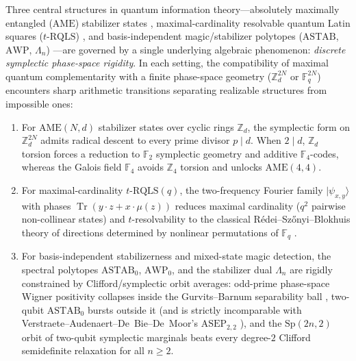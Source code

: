 \documentclass[11pt,reqno]{amsart}
\theoremstyle{definition}
\newcommand{\ZZ}{\mathbb{Z}}
\newcommand{\FF}{\mathbb{F}}
\newcommand{\Tr}{\operatorname{Tr}}
\newcommand{\AME}{\mathrm{AME}}
\newcommand{\RQLS}{\mathrm{RQLS}}
\newcommand{\ASTAB}{\mathrm{ASTAB}}
\newcommand{\AWP}{\mathrm{AWP}}
\newcommand{\ASEP}{\mathrm{ASEP}}
\newcommand{\Sp}{\mathrm{Sp}}
\begin{document}
Three central structures in quantum information theory---absolutely maximally entangled
($\AME$) stabilizer states \cite{scott2004multipartite,huber2018bounds,rajchel2025ame,
wojcik2026ame,cha2026ame}, maximal-cardinality resolvable quantum Latin squares
($t$-$\RQLS$) \cite{musto2016qls,rather2022euler,ball2026moqls,zhang2026rqls}, and
basis-independent magic/stabilizer polytopes ($\ASTAB$, $\AWP$, $\Lambda_n$)
\cite{gross2006hudson,raussendorf2020phase,zurel2020hvm,liu2025triangle,zurel2026astab}---are
governed by a single underlying algebraic phenomenon: \emph{discrete symplectic
phase-space rigidity}. In each setting, the compatibility of maximal quantum
complementarity with a finite phase-space geometry ($\ZZ_d^{2N}$ or $\FF_q^{2N}$)
encounters sharp arithmetic transitions separating realizable structures from impossible
ones:
\begin{enumerate}[label=(\roman*)]
  \item For $\AME(N, d)$ stabilizer states over cyclic rings $\ZZ_d$, the symplectic
    form on $\ZZ_d^{2N}$ admits radical descent to every prime divisor $p \mid d$.
    When $2 \mid d$, $\ZZ_d$ torsion forces a reduction to $\FF_2$ symplectic geometry
    and additive $\FF_4$-codes, whereas the Galois field $\FF_4$ avoids $\ZZ_4$ torsion
    and unlocks $\AME(4,4)$.
  \item For maximal-cardinality $t$-$\RQLS(q)$, the two-frequency Fourier family
    $|\psi_{x,y}\rangle$ with phases $\Tr(y \cdot z + x \cdot \mu(z))$ reduces maximal
    cardinality ($q^2$ pairwise non-collinear states) and $t$-resolvability to the
    classical R\'edei--Sz\H{o}nyi--Blokhuis theory of directions determined by nonlinear
    permutations of $\FF_q$ \cite{redei1973lacunary,szonyi1996directions,
    blokhuis1999slopes}.
  \item For basis-independent stabilizerness and mixed-state magic detection, the
    spectral polytopes $\ASTAB_0$, $\AWP_0$, and the stabilizer dual $\Lambda_n$ are
    rigidly constrained by Clifford/symplectic orbit averages: odd-prime phase-space
    Wigner positivity collapses inside the Gurvits--Barnum separability ball
    \cite{gurvits2002largest}, two-qubit $\ASTAB_0$ bursts outside it (and is strictly
    incomparable with Verstraete--Audenaert--De~Bie--De~Moor's $\ASEP_{2,2}$
    \cite{verstraete2001maximally}), and the $\Sp(2n,2)$ orbit of two-qubit symplectic
    marginals beats every degree-$2$ Clifford semidefinite relaxation for all $n \ge 2$.
\end{enumerate}
\end{document}
